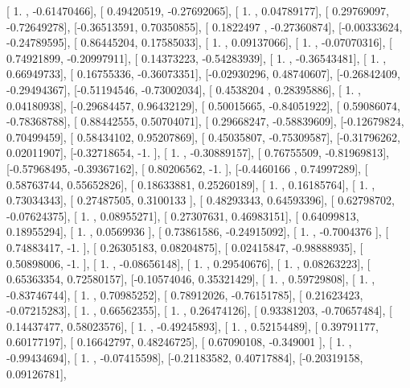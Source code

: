 \documentclass{article}
\begin{document}
       [ 1.        , -0.61470466],
       [ 0.49420519, -0.27692065],
       [ 1.        ,  0.04789177],
       [ 0.29769097, -0.72649278],
       [-0.36513591,  0.70350855],
       [ 0.1822497 , -0.27360874],
       [-0.00333624, -0.24789595],
       [ 0.86445204,  0.17585033],
       [ 1.        ,  0.09137066],
       [ 1.        , -0.07070316],
       [ 0.74921899, -0.20997911],
       [ 0.14373223, -0.54283939],
       [ 1.        , -0.36543481],
       [ 1.        ,  0.66949733],
       [ 0.16755336, -0.36073351],
       [-0.02930296,  0.48740607],
       [-0.26842409, -0.29494367],
       [-0.51194546, -0.73002034],
       [ 0.4538204 ,  0.28395886],
       [ 1.        ,  0.04180938],
       [-0.29684457,  0.96432129],
       [ 0.50015665, -0.84051922],
       [ 0.59086074, -0.78368788],
       [ 0.88442555,  0.50704071],
       [ 0.29668247, -0.58839609],
       [-0.12679824,  0.70499459],
       [ 0.58434102,  0.95207869],
       [ 0.45035807, -0.75309587],
       [-0.31796262,  0.02011907],
       [-0.32718654, -1.        ],
       [ 1.        , -0.30889157],
       [ 0.76755509, -0.81969813],
       [-0.57968495, -0.39367162],
       [ 0.80206562, -1.        ],
       [-0.4460166 ,  0.74997289],
       [ 0.58763744,  0.55652826],
       [ 0.18633881,  0.25260189],
       [ 1.        ,  0.16185764],
       [ 1.        ,  0.73034343],
       [ 0.27487505,  0.3100133 ],
       [ 0.48293343,  0.64593396],
       [ 0.62798702, -0.07624375],
       [ 1.        ,  0.08955271],
       [ 0.27307631,  0.46983151],
       [ 0.64099813,  0.18955294],
       [ 1.        ,  0.0569936 ],
       [ 0.73861586, -0.24915092],
       [ 1.        , -0.7004376 ],
       [ 0.74883417, -1.        ],
       [ 0.26305183,  0.08204875],
       [ 0.02415847, -0.98888935],
       [ 0.50898006, -1.        ],
       [ 1.        , -0.08656148],
       [ 1.        ,  0.29540676],
       [ 1.        ,  0.08263223],
       [ 0.65363354,  0.72580157],
       [-0.10574046,  0.35321429],
       [ 1.        ,  0.59729808],
       [ 1.        , -0.83746744],
       [ 1.        ,  0.70985252],
       [ 0.78912026, -0.76151785],
       [ 0.21623423, -0.07215283],
       [ 1.        ,  0.66562355],
       [ 1.        ,  0.26474126],
       [ 0.93381203, -0.70657484],
       [ 0.14437477,  0.58023576],
       [ 1.        , -0.49245893],
       [ 1.        ,  0.52154489],
       [ 0.39791177,  0.60177197],
       [ 0.16642797,  0.48246725],
       [ 0.67090108, -0.349001  ],
       [ 1.        , -0.99434694],
       [ 1.        , -0.07415598],
       [-0.21183582,  0.40717884],
       [-0.20319158,  0.09126781],
\end{document}

